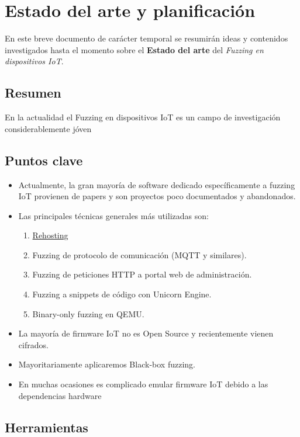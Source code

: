 \documentclass[11pt, a4paper, openany]{report}
\begin{document}
	\chapter{Estado del arte y planificación}

    En este breve documento de carácter temporal se resumirán ideas y contenidos investigados 
    hasta el momento sobre el \textbf{Estado del arte} del \textit{Fuzzing en dispositivos IoT}.

    \section{Resumen}
    En la actualidad el Fuzzing en dispositivos IoT es un campo de investigación considerablemente
    jóven

    \section{Puntos clave}
    \begin{itemize}
        \item Actualmente, la gran mayoría de software dedicado específicamente a fuzzing IoT 
        provienen de papers y son proyectos poco documentados y abandonados.
        \item Las principales técnicas generales más utilizadas son:
        \begin{enumerate}
            \item \href{https://rehosti.ng/}{Rehosting}
            \item Fuzzing de protocolo de comunicación (MQTT y similares).
            \item Fuzzing de peticiones HTTP a portal web de administración.
            \item Fuzzing a snippets de código con Unicorn Engine.
            \item Binary-only fuzzing en QEMU.
        \end{enumerate}
        \item La mayoría de firmware IoT no es Open Source y recientemente vienen cifrados.
        \item Mayoritariamente aplicaremos Black-box fuzzing.
        \item En muchas ocasiones es complicado emular firmware IoT debido a las dependencias
        hardware
    \end{itemize}

    \section{Herramientas}
    
\end{document}
